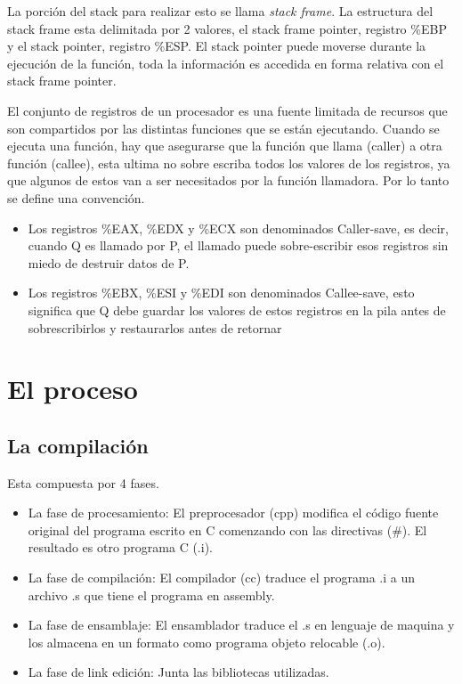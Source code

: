 \documentclass[titlepage,a4paper]{article}
\begin{document}
La porción del stack para realizar esto se llama \textit{stack frame}. La estructura del stack frame esta delimitada por 2 valores, el stack frame pointer, registro \%EBP y el stack pointer, registro \%ESP. El stack pointer puede moverse durante la ejecución de la función, toda la información es accedida en forma relativa con el stack frame pointer.

El conjunto de registros de un procesador es una fuente limitada de recursos que son compartidos por las distintas funciones que se están ejecutando. Cuando se ejecuta una función, hay que asegurarse que la función que llama (caller) a otra función (callee), esta ultima no sobre escriba todos los valores de los registros, ya que algunos de estos van a ser necesitados por la función llamadora. Por lo tanto se define una convención. 

\begin{itemize}
    \item Los registros \%EAX, \%EDX y \%ECX son denominados Caller-save, es decir, cuando Q es llamado por P, el llamado puede sobre-escribir esos registros sin miedo de destruir datos de P.
    \item Los registros \%EBX, \%ESI y \%EDI son denominados Callee-save, esto significa que Q debe guardar los valores de estos registros en la pila antes de sobrescribirlos y restaurarlos antes de retornar
\end{itemize}

\section{El proceso}
\subsection*{La compilación}
Esta compuesta por 4 fases.
\begin{itemize}
    \item La fase de procesamiento: El preprocesador (cpp) modifica el código fuente original del programa escrito en C comenzando con las directivas (\#). El resultado es otro programa C (.i).
    \item La fase de compilación: El compilador (cc) traduce el programa .i a un archivo .s que tiene el programa en assembly.
    \item La fase de ensamblaje: El ensamblador traduce el .s en lenguaje de maquina y los almacena en un formato como programa objeto relocable (.o).
    \item La fase de link edición: Junta las bibliotecas utilizadas.
\end{itemize}
\end{document}
